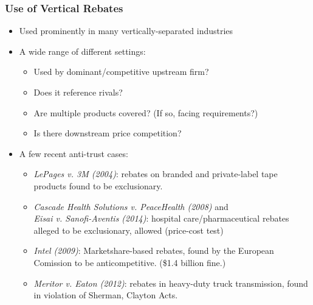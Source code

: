 \documentclass[aspectratio=169,11pt]{beamer}
\begin{document}
\begin{frame}
\frametitle{Use of Vertical Rebates}
\begin{itemize}
\item Used prominently in many vertically-separated industries 
\item A wide range of different settings:
	\begin{itemize}
	\item Used by dominant/competitive upstream firm? 
	\item Does it reference rivals? 
	\item Are multiple products covered? (If so, facing requirements?)
	\item Is there downstream price competition?
	\end{itemize}
\item A few recent anti-trust cases: 
	\begin{itemize} \footnotesize
	\item \textit{LePages v. 3M (2004)}: rebates on branded and private-label tape products found to be exclusionary.
	\item \textit{Cascade Health Solutions v. PeaceHealth (2008)} and \\ \textit{Eisai v. Sanofi-Aventis (2014)}: hospital care/pharmaceutical rebates alleged to be exclusionary, allowed (price-cost test) \\
	\item \textit{Intel (2009)}: Marketshare-based rebates, found by the European Comission to be anticompetitive. (\$1.4 billion fine.)
	\item \textit{Meritor v. Eaton (2012)}: rebates in heavy-duty truck transmission, found in violation of Sherman, Clayton Acts.
	\end{itemize}
\end{itemize}
\end{frame}
\end{document}
